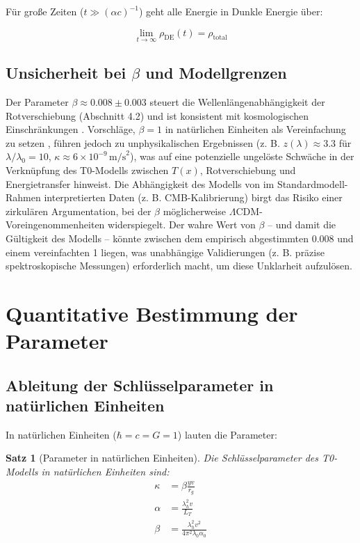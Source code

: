 \documentclass[a4paper,12pt]{article}
\newtheorem{theorem}{Satz}[section]
\theoremstyle{definition}
\theoremstyle{remark}
\newcommand{\Tfield}{T(x)} %
\begin{document}
	Für große Zeiten (\(t \gg (\alpha c)^{-1}\)) geht alle Energie in Dunkle Energie über:
	
	\begin{equation}
		\lim_{t \rightarrow \infty} \rho_{\text{DE}}(t) = \rho_{\text{total}}
	\end{equation}
	
	\subsection{Unsicherheit bei \(\beta\) und Modellgrenzen}
	
	Der Parameter \(\beta \approx 0.008 \pm 0.003\) steuert die Wellenlängenabhängigkeit der Rotverschiebung (Abschnitt 4.2) und ist konsistent mit kosmologischen Einschränkungen \cite{pascher_messdifferenzen_2025}. Vorschläge, \(\beta = 1\) in natürlichen Einheiten als Vereinfachung zu setzen \cite{pascher_temp_2025}, führen jedoch zu unphysikalischen Ergebnissen (z. B. \(z(\lambda) \approx 3.3\) für \(\lambda/\lambda_0 = 10\), \(\kappa \approx 6 \times 10^{-9} \, \text{m/s}^2\)), was auf eine potenzielle ungelöste Schwäche in der Verknüpfung des T0-Modells zwischen \(\Tfield\), Rotverschiebung und Energietransfer hinweist. Die Abhängigkeit des Modells von im Standardmodell-Rahmen interpretierten Daten (z. B. CMB-Kalibrierung) birgt das Risiko einer zirkulären Argumentation, bei der \(\beta\) möglicherweise \(\Lambda\)CDM-Voreingenommenheiten widerspiegelt. Der wahre Wert von \(\beta\) – und damit die Gültigkeit des Modells – könnte zwischen dem empirisch abgestimmten 0.008 und einem vereinfachten 1 liegen, was unabhängige Validierungen (z. B. präzise spektroskopische Messungen) erforderlich macht, um diese Unklarheit aufzulösen.
	
	\section{Quantitative Bestimmung der Parameter}
	
	\subsection{Ableitung der Schlüsselparameter in natürlichen Einheiten}
	
	In natürlichen Einheiten (\(\hbar = c = G = 1\)) lauten die Parameter:
	
	\begin{theorem}[Parameter in natürlichen Einheiten]
		Die Schlüsselparameter des T0-Modells in natürlichen Einheiten sind:
		\begin{align}
			\kappa &= \beta \frac{y v}{r_g} \\
			\alpha &= \frac{\lambda_h^2 v}{L_T} \\
			\beta &= \frac{\lambda_h^2 v^2}{4\pi^2 \lambda_0 \alpha_0}
		\end{align}
	\end{theorem}
	
\end{document}
